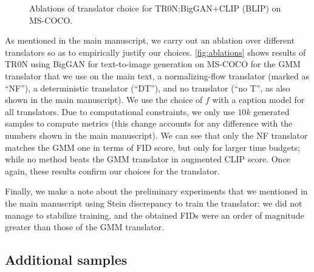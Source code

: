 \documentclass[nohyperref]{article}
\theoremstyle{plain}
\theoremstyle{definition}
\theoremstyle{remark}
\begin{document}
\begin{figure}[t!]
 \caption{Ablations of translator choice for TR0N:BigGAN+CLIP (BLIP) on MS-COCO.}
    \label{fig:ablations}
\end{figure}

As mentioned in the main manuscript, we carry out an ablation over different translators so as to empirically justify our choices. \autoref{fig:ablations} shows results of TR0N using BigGAN for text-to-image generation on MS-COCO for the GMM translator that we use on the main text, a normalizing-flow translator (marked as ``NF''), a deterministic translator (``DT''), and no translator (``no T'', as also shown in the main manuscript). We use the choice of $f$ with a caption model for all translators. Due to computational constraints, we only use $10k$ generated samples to compute metrics (this change accounts for any difference with the numbers shown in the main manuscript). We can see that only the NF translator matches the GMM one in terms of FID score, but only for larger time budgets; while no method beats the GMM translator in augmented CLIP score. Once again, these results confirm our choices for the translator.

Finally, we make a note about the preliminary experiments that we mentioned in the main manuscript using Stein discrepancy to train the translator: we did not manage to stabilize training, and the obtained FIDs were an order of magnitude greater than those of the GMM translator.

\subsection{Additional samples}
\end{document}
